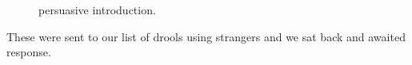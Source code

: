 \begin{figure}[h]
    \centering
    \caption{persuasive introduction.}
    \label{fig:persuasive_introduction}
\end{figure}

These were sent to our list of drools using strangers and we sat back and awaited response.
